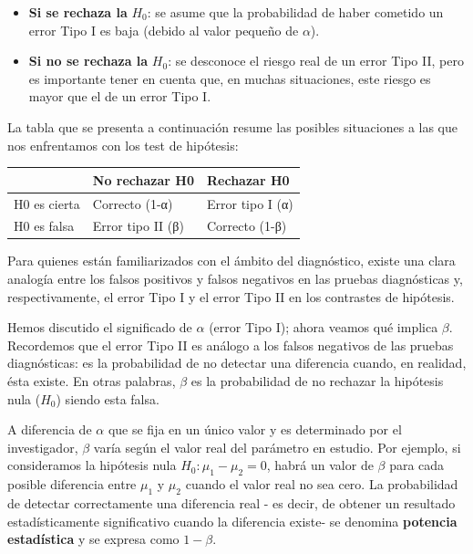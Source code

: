 \documentclass[
  spanish,
  a4paper,
]{scrbook}
\newcounter{none} %
\begin{document}
\begin{itemize}
\item
  \textbf{Si se rechaza la} \(H_0\): se asume que la probabilidad de
  haber cometido un error Tipo I es baja (debido al valor pequeño de
  \(\alpha\)).
\item
  \textbf{Si no se rechaza la} \(H_0\): se desconoce el riesgo real de
  un error Tipo II, pero es importante tener en cuenta que, en muchas
  situaciones, este riesgo es mayor que el de un error Tipo I.
\end{itemize}

La tabla que se presenta a continuación resume las posibles situaciones
a las que nos enfrentamos con los test de hipótesis:

{\def\LTcaptype{none} %
\begin{longtable}[]{@{}lll@{}}
\toprule\noalign{}
& No rechazar H0 & Rechazar H0 \\
\midrule\noalign{}
\endhead
\bottomrule\noalign{}
\endlastfoot
H0 es cierta & Correcto (1-α) & Error tipo I (α) \\
H0 es falsa & Error tipo II (β) & Correcto (1-β) \\
\end{longtable}
}

Para quienes están familiarizados con el ámbito del diagnóstico, existe
una clara analogía entre los falsos positivos y falsos negativos en las
pruebas diagnósticas y, respectivamente, el error Tipo I y el error Tipo
II en los contrastes de hipótesis.

Hemos discutido el significado de \(\alpha\) (error Tipo I); ahora
veamos qué implica \(\beta\). Recordemos que el error Tipo II es análogo
a los falsos negativos de las pruebas diagnósticas: es la probabilidad
de no detectar una diferencia cuando, en realidad, ésta existe. En otras
palabras, \(\beta\) es la probabilidad de no rechazar la hipótesis nula
(\(H_0\)\hspace{0pt}) siendo esta falsa.

A diferencia de \(\alpha\) que se fija en un único valor y es
determinado por el investigador, \(\beta\) varía según el valor real del
parámetro en estudio. Por ejemplo, si consideramos la hipótesis nula
\(H_0: \mu_1 - \mu_2 = 0\), habrá un valor de \(\beta\) para cada
posible diferencia entre \(\mu_1\)\hspace{0pt} y \(\mu_2\) cuando el
valor real no sea cero. La probabilidad de detectar correctamente una
diferencia real - es decir, de obtener un resultado estadísticamente
significativo cuando la diferencia existe- se denomina \textbf{potencia
estadística} y se expresa como \(1-\beta\).
\end{document}
